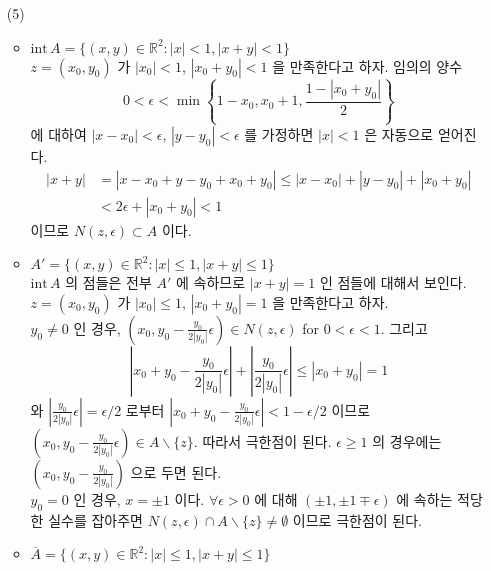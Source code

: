 \documentclass[12pt]{report}
\newcommand{\abs}[1]{\left|#1\right|}
\newcommand{\inte}{\mathrm{int}\,}
\newcommand{\bs}{\backslash}
\newcommand{\R}{\mathbb{R}}
\begin{document}
\begin{enumerate}
\begin{enumerate}
	\item[(5)]
	\begin{itemize}
		\item $\inte A = \{(x, y)\in \R^2: \abs{x} < 1, \abs{x+y}<1 \}$\\
		$z = (x_0, y_0)$ 가 $\abs{x_0} < 1$, $\abs{x_0+y_0} <1$ 을 만족한다고 하자. 임의의 양수 $$0 < \epsilon < \min\left\{1-x_0, x_0 + 1, \frac{1-\abs{x_0+y_0}}{2} \right\}$$
		에 대하여 $\abs{x-x_0} < \epsilon$, $\abs{y - y_0} < \epsilon$ 를 가정하면 $\abs{x} < 1$ 은 자동으로 얻어진다.\\
		$$\begin{aligned}
			\abs{x+y} &= \abs{x - x_0 + y - y_0 + x_0 + y_0} \leq \abs{x-x_0} + \abs{y-y_0} + \abs{x_0+y_0}\\
			&< 2\epsilon + \abs{x_0+y_0} < 1
		\end{aligned}$$
		이므로 $N(z, \epsilon) \subset A$ 이다.
		\item $A' = \{(x, y)\in \R^2: \abs{x} \leq 1, \abs{x+y} \leq 1 \}$\\
		$\inte A$ 의 점들은 전부 $A'$ 에 속하므로 $\abs{x+y} = 1$ 인 점들에 대해서 보인다.\\
		$z = (x_0, y_0)$ 가 $\abs{x_0} \leq 1$, $\abs{x_0+y_0} = 1$ 을 만족한다고 하자.\\
		$y_0 \neq 0$ 인 경우, $(x_0, y_0 - \frac{y_0}{2\abs{y_0}}\epsilon) \in N(z, \epsilon)$ for $0 < \epsilon < 1$. 그리고 $$\abs{x_0 + y_0 - \frac{y_0}{2\abs{y_0}}\epsilon} + \abs{\frac{y_0}{2\abs{y_0}}\epsilon}\leq \abs{x_0+y_0} = 1$$
		와 $\abs{\frac{y_0}{2\abs{y_0}}\epsilon} = \epsilon/2$ 로부터 $\abs{x_0 + y_0 - \frac{y_0}{2\abs{y_0}}\epsilon} < 1- \epsilon/2$ 이므로 $(x_0, y_0 - \frac{y_0}{2\abs{y_0}}\epsilon)\in A\bs \{z\}$. 따라서 극한점이 된다. $\epsilon \geq 1$ 의 경우에는 $(x_0, y_0 - \frac{y_0}{2\abs{y_0}})$ 으로 두면 된다.  \\
		$y_0 = 0$ 인 경우, $x = \pm 1$ 이다. $\forall \epsilon > 0$ 에 대해 $(\pm 1, \pm1 \mp \epsilon)$ 에 속하는 적당한 실수를 잡아주면 $N(z, \epsilon) \cap A\bs \{z\} \neq \emptyset$ 이므로 극한점이 된다. 
		\item $\overline{A} = \{(x, y)\in \R^2: \abs{x} \leq 1, \abs{x+y} \leq 1 \}$
	\end{itemize}
\end{enumerate}


\end{enumerate}
\end{document}
